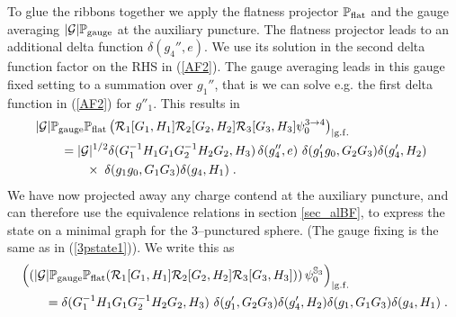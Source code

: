 \documentclass[nofootinbib,superscriptaddress,eqsecnum,tightenlines,11pt]{revtex4-1}
\def\nn{\nonumber}
\def\q{\qquad}
\def\mG{\mathcal{G}}
\begin{document}
To glue the ribbons together we apply the flatness projector  $\mathbb{P}_{\rm flat}$ and the gauge averaging $|\mG| \mathbb{P}_{\rm gauge}$ at the auxiliary puncture.  The flatness projector leads to an additional delta function $\delta(g_4'',e)$. We use its solution in the second delta function factor on the RHS in (\ref{AF2}). The gauge averaging leads in this gauge fixed setting to a summation over $g_1''$, that is we can solve e.g. the first  delta function in (\ref{AF2}) for $g''_1$. This results in
\begin{align}
&|\mG| \mathbb{P}_{\rm gauge} \mathbb{P}_{\rm flat}\left( {\cal R}_1[G_1,H_1]{\cal R}_2[G_2,H_2]{\cal R}_3[G_3,H_3] {\psi_0^{3\rightarrow4}}\right)_{|\rm g.f.} \nn\\
&\q = |\mG|^{1/2} \delta(    G_1^{-1} H_1 G_1 G_2^{-1} H_2 G_2  , H_3) \, \delta(g_4'',e)
\, \, \delta(g'_1 g_0,G_2 G_3) \delta(g'_4,H_2) \,\, \nn\\
&\q \q \times \;\delta(g_1 g_0,G_1 G_3 ) \delta(  g_4,  H_1)   \; .
\end{align}
We have now projected away any charge contend at the auxiliary puncture, and can therefore use the equivalence relations in section \ref{sec_alBF}, to express the state on a minimal graph for the 3--punctured sphere. (The  gauge fixing is the same as in (\ref{3pstate1})). We write this as
\begin{align}
&\left(\left(   |\mG| \mathbb{P}_{\rm gauge} \mathbb{P}_{\rm flat} ({\cal R}_1[G_1,H_1]{\cal R}_2[G_2,H_2]{\cal R}_3[G_3,H_3] )\right) \psi^{{\mathbb S}_3}_0\right)_{|\rm g.f.} \nn\\
&\q = \delta(    G_1^{-1} H_1 G_1 G_2^{-1} H_2 G_2  , H_3)\, \, \delta(g'_1 ,G_2 G_3) \delta(g'_4,H_2) \delta(g_1,G_1 G_3 ) \delta(  g_4,  H_1)  \; .
\end{align}
\end{document}
